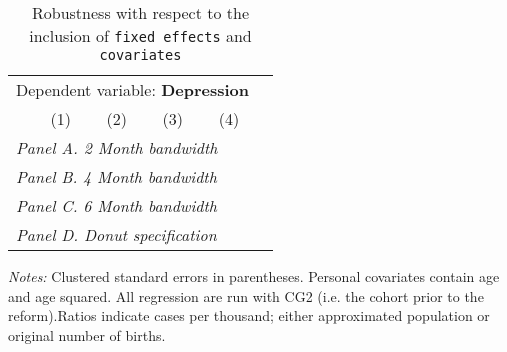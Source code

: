  \begin{table}[H] \begin{threeparttable} \centering \caption{Robustness with respect to the inclusion of \texttt{fixed effects} and \texttt{covariates}} {\def\sym#1{\ifmmode^{#1}\else\(^{#1}\)\fi} \begin{tabular}{l*{5}{c}} \toprule \multicolumn{5}{c}{Dependent variable: \textbf{Depression}} \\ \cmidrule(lr){2-5}
            &\multicolumn{1}{c}{(1)}&\multicolumn{1}{c}{(2)}&\multicolumn{1}{c}{(3)}&\multicolumn{1}{c}{(4)}\\
\midrule
 \multicolumn{5}{l}{\emph{Panel A. 2 Month bandwidth}} \\    \midrule\multicolumn{5}{l}{\emph{Panel B. 4 Month bandwidth}} \\    \midrule\multicolumn{5}{l}{\emph{Panel C. 6 Month bandwidth}} \\    \midrule\multicolumn{5}{l}{\emph{Panel D. Donut specification}} \\    \midrule  
\bottomrule \end{tabular} } \begin{tablenotes} \item \scriptsize \emph{Notes:} Clustered standard errors in parentheses. Personal covariates contain age and age squared. All regression are run with CG2 (i.e. the cohort prior to the reform).Ratios indicate cases per thousand; either approximated population or original number of births. \end{tablenotes} \end{threeparttable} \end{table} 
